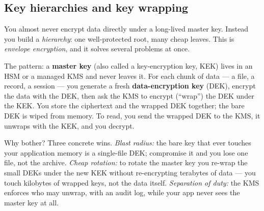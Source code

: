 \subsection{Key hierarchies and key wrapping}

You almost never encrypt data directly under a long-lived master key. Instead you
build a \emph{hierarchy}: one well-protected root, many cheap leaves. This is
\emph{envelope encryption}, and it solves several problems at once.

The pattern: a \textbf{master key} (also called a key-encryption key, KEK) lives in
an HSM or a managed KMS and never leaves it. For each chunk of data --- a file, a
record, a session --- you generate a fresh \textbf{data-encryption key} (DEK),
encrypt the data with the DEK, then ask the KMS to encrypt (``wrap'') the DEK under
the KEK. You store the ciphertext and the wrapped DEK together; the bare DEK is
wiped from memory. To read, you send the wrapped DEK to the KMS, it unwraps with
the KEK, and you decrypt.

\begin{center}
\end{center}

Why bother? Three concrete wins. \emph{Blast radius:} the bare key that ever
touches your application memory is a single-file DEK; compromise it and you lose one
file, not the archive. \emph{Cheap rotation:} to rotate the master key you re-wrap
the small DEKs under the new KEK without re-encrypting terabytes of data ---
you touch kilobytes of wrapped keys, not the data itself. \emph{Separation of duty:}
the KMS enforces who may unwrap, with an audit log, while your app never sees the
master key at all.

